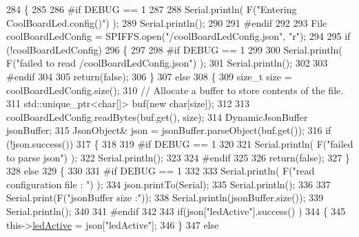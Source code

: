 \begin{DoxyCode}
284 \{
285 
286 \textcolor{preprocessor}{#if DEBUG == 1 }
287         
288     Serial.println( F(\textcolor{stringliteral}{"Entering CoolBoardLed.config()"}) );
289     Serial.println();
290 
291 \textcolor{preprocessor}{#endif}
292     
293     File coolBoardLedConfig = SPIFFS.open(\textcolor{stringliteral}{"/coolBoardLedConfig.json"}, \textcolor{stringliteral}{"r"});
294 
295     \textcolor{keywordflow}{if} (!coolBoardLedConfig) 
296     \{
297     
298 \textcolor{preprocessor}{    #if DEBUG == 1}
299 
300         Serial.println( F(\textcolor{stringliteral}{"failed to read /coolBoardLedConfig.json"}) );
301         Serial.println();
302 
303 \textcolor{preprocessor}{    #endif}
304 
305         \textcolor{keywordflow}{return}(\textcolor{keyword}{false});
306     \}
307     \textcolor{keywordflow}{else}
308     \{
309         \textcolor{keywordtype}{size\_t} size = coolBoardLedConfig.size();
310         \textcolor{comment}{// Allocate a buffer to store contents of the file.}
311         std::unique\_ptr<char[]> buf(\textcolor{keyword}{new} \textcolor{keywordtype}{char}[size]);
312 
313         coolBoardLedConfig.readBytes(buf.get(), size);
314         DynamicJsonBuffer jsonBuffer;
315         JsonObject& json = jsonBuffer.parseObject(buf.get());
316         \textcolor{keywordflow}{if} (!json.success()) 
317         \{
318         
319 \textcolor{preprocessor}{        #if DEBUG == 1}
320 
321             Serial.println( F(\textcolor{stringliteral}{"failed to parse json"}) );
322             Serial.println();
323         
324 \textcolor{preprocessor}{        #endif}
325 
326             \textcolor{keywordflow}{return}(\textcolor{keyword}{false});
327         \} 
328         \textcolor{keywordflow}{else}
329         \{
330         
331 \textcolor{preprocessor}{        #if DEBUG == 1}
332     
333             Serial.println( F(\textcolor{stringliteral}{"read configuration file : "}) );
334             json.printTo(Serial);
335             Serial.println();
336             
337             Serial.print(F(\textcolor{stringliteral}{"jsonBuffer size :"}));
338             Serial.println(jsonBuffer.size());
339             Serial.println();
340 
341 \textcolor{preprocessor}{        #endif}
342   
343             \textcolor{keywordflow}{if}(json[\textcolor{stringliteral}{"ledActive"}].success() )
344             \{
345                 this->\hyperlink{class_cool_board_led_aadd04d2ecf123247718d77f42fba7f08}{ledActive} = json[\textcolor{stringliteral}{"ledActive"}]; 
346             \}
347             \textcolor{keywordflow}{else}

\end{DoxyCode}
